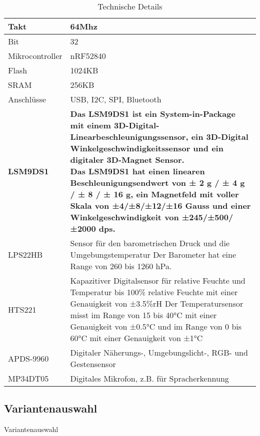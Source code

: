 \begin{table}[H]
  \centering
  \settowidth{}
  \setlength\extrarowheight{2pt}
  \begin{tabulary}{1.0\textwidth}{|L|L|}
    \hline
    Takt &
    64Mhz\\
    \hline
    Bit & 32 \\
    \hline
    Mikrocontroller& nRF52840 \\
    \hline
    Flash & 1024KB \\
    \hline
    SRAM&  256KB\\
    \hline
    Anschlüsse& USB, I2C, SPI, Bluetooth \\
    \hline
    \textbf{LSM9DS1}& \textbf{Das LSM9DS1 ist ein System-in-Package mit einem 3D-Digital-Linearbeschleunigungssensor, ein 3D-Digital Winkelgeschwindigkeitssensor und ein digitaler 3D-Magnet Sensor.\newline
    Das LSM9DS1 hat einen linearen Beschleunigungsendwert von ± 2 g / ± 4 g / ± 8 / ± 16 g, ein Magnetfeld mit voller Skala von ±4/±8/±12/±16 Gauss und einer Winkelgeschwindigkeit von ±245/±500/±2000 dps.
    } \\
    \hline
    LPS22HB& Sensor für den barometrischen Druck und die Umgebungstemperatur\newline
    Der Barometer hat eine Range von 260 bis 1260 hPa. 
     \\
    \hline
    HTS221 & Kapazitiver Digitalsensor für relative Feuchte und Temperatur bis 100\% relative Feuchte mit einer Genauigkeit von ±3.5\%rH\newline
    Der Temperatursensor misst im Range von 15 bis 40°C mit einer Genauigkeit von ±0.5°C und im Range von 0 bis 60°C mit einer Genauigkeit von ±1°C 
     \\
    \hline
    APDS-9960& Digitaler Näherungs-, Umgebungslicht-, RGB- und Gestensensor \\
    \hline
    MP34DT05& Digitales Mikrofon, z.B. für Spracherkennung \\
    \hline
  \end{tabulary}
  \caption{Technische Details}
\end{table}


\subsection{Variantenauswahl}
Variantenauswahl

\newpage